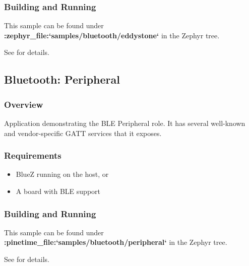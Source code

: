 \documentclass[letterpaper,10pt,english]{sphinxmanual}
\begin{document}
\subsubsection{Building and Running}
\label{\detokenize{samples/bluetooth/eddystone/README:building-and-running}}
This sample can be found under {\color{red}\bfseries{}:zephyr\_file:{}`samples/bluetooth/eddystone{}`} in the
Zephyr tree.

See {\hyperref[\detokenize{samples/bluetooth/bluetooth:bluetooth-samples}]{}} for details.


\subsection{Bluetooth: Peripheral}
\label{\detokenize{samples/bluetooth/peripheral/README:bluetooth-peripheral}}\label{\detokenize{samples/bluetooth/peripheral/README:ble-peripheral}}\label{\detokenize{samples/bluetooth/peripheral/README::doc}}

\subsubsection{Overview}
\label{\detokenize{samples/bluetooth/peripheral/README:overview}}
Application demonstrating the BLE Peripheral role. It has several well-known and
vendor-specific GATT services that it exposes.


\subsubsection{Requirements}
\label{\detokenize{samples/bluetooth/peripheral/README:requirements}}\begin{itemize}
\item {} 
BlueZ running on the host, or

\item {} 
A board with BLE support

\end{itemize}


\subsubsection{Building and Running}
\label{\detokenize{samples/bluetooth/peripheral/README:building-and-running}}
This sample can be found under {\color{red}\bfseries{}:pinetime\_file:{}`samples/bluetooth/peripheral{}`} in the
Zephyr tree.

See {\hyperref[\detokenize{samples/bluetooth/bluetooth:bluetooth-samples}]{}} for details.
\end{document}

